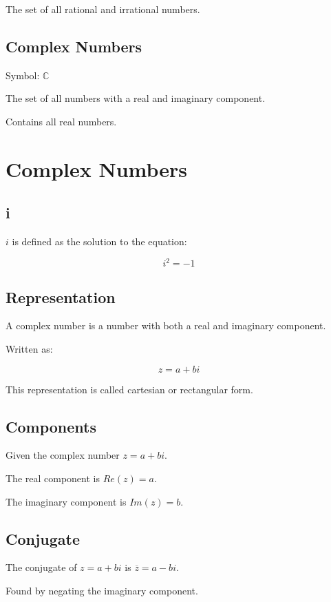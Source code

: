 \documentclass[a4paper,11pt]{article}
\begin{document}
The set of all rational and irrational numbers.


\subsection{Complex Numbers}

Symbol: $\mathbb{C}$

The set of all numbers with a real and imaginary component.

Contains all real numbers.



\section{Complex Numbers}

\subsection{i}

$i$ is defined as the solution to the equation:

$$
i^2 = -1
$$


\subsection{Representation}

A complex number is a number with both a real and imaginary component.

Written as:

$$
z = a + bi
$$

This representation is called cartesian or rectangular form.


\subsection{Components}

Given the complex number $z = a + bi$.

The real component is $Re(z) = a$.

The imaginary component is $Im(z) = b$.


\subsection{Conjugate}

The conjugate of $z = a + bi$ is $\overline{z} = a - bi$.

Found by negating the imaginary component.
\end{document}
